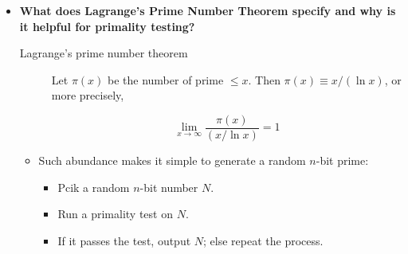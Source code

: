 \documentclass[a4paper,11pt]{article}
\begin{document}
\begin{itemize}
\item
  \textbf{What does Lagrange's Prime Number Theorem specify and why is
  it helpful for primality testing?}

  \begin{description}
  \item[Lagrange's prime number theorem]
  Let $\pi(x)$ be the number of prime $\le x$. Then
  $\pi(x) \equiv x / (\ln x)$, or more precisely,

  \[\lim_{x \to \infty} \frac{\pi(x)}{(x / \ln x)} = 1\]
  \end{description}

  \begin{itemize}
  \itemsep1pt\parskip0pt
  \item
    Such abundance makes it simple to generate a random $n$-bit prime:

    \begin{itemize}
    \itemsep1pt\parskip0pt
    \item
      Pcik a random $n$-bit number $N$.
    \item
      Run a primality test on $N$.
    \item
      If it passes the test, output $N$; else repeat the process.
    \end{itemize}
  \end{itemize}
\end{itemize}
\end{document}
